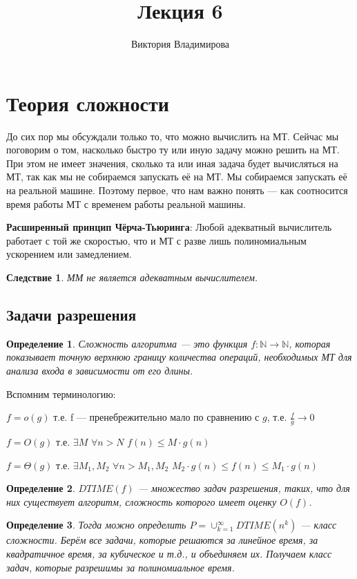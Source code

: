 \documentclass[a4paper]{article}
\title{Лекция 6}
\author{Виктория Владимирова}
\newtheorem{definition}{Определение}
\newtheorem{consequence}{Следствие}
\begin{document}
\section{Теория сложности}

{\large 

До сих пор мы обсуждали только то, что можно вычислить на МТ. Сейчас мы поговорим о том, насколько быстро ту или иную задачу можно решить на МТ. При этом не имеет значения, сколько та или иная задача будет вычисляться на МТ, так как мы не собираемся запускать её на МТ. Мы собираемся запускать её на реальной машине. Поэтому первое, что нам важно понять — как соотносится время работы МТ с временем работы реальной машины.

\textbf{Расширенный принцип Чёрча-Тьюринга}: Любой адекватный вычислитель работает с той же скоростью, что и МТ с разве лишь полиномиальным ускорением или замедлением.

\begin{consequence}
ММ не является адекватным вычислителем.
\end{consequence}

\subsection{Задачи разрешения}
\begin{definition} Сложность алгоритма — это функция $f:\mathbb{N}\to\mathbb{N}$, которая показывает точную верхнюю границу количества операций, необходимых МТ для анализа входа в зависимости от его длины.
\end{definition}

Вспомним терминологию:

$f = o(g)$  т.е. f — пренебрежительно мало по сравнению с $g$, т.е. $ \frac{f}{g}\longrightarrow 0$

$f = O(g)$ т.е.  $\exists M$ $\forall n > N$ $f(n) \le M \cdot g(n)$

$f = \Theta(g)$ т.е. $\exists M_1, M_2$ $\forall n > M_1, M_2$ $M_2 \cdot g(n) \le f(n) \le M_1 \cdot g(n)$

\begin{definition} $DTIME(f)$ — множество задач разрешения, таких, что для них существует алгоритм, сложность которого имеет оценку $O(f)$.
\end{definition}

\begin{definition} Тогда можно определить $P = \cup_{k=1}^{\infty}DTIME(n^{k})$ — класс сложности. Берём все задачи, которые решаются за линейное время, за квадратичное время, за кубическое и т.д., и объединяем их. Получаем класс задач, которые разрешимы за полиномиальное время.
\end{definition}

}
\end{document}
